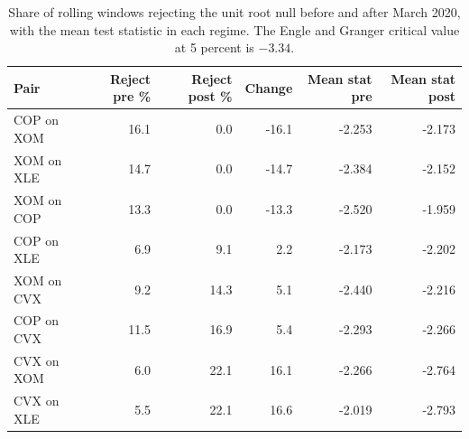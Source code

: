\begin{table}[H]
\centering
\caption{Share of rolling windows rejecting the unit root null before and after March 2020, with the mean test statistic in each regime. The Engle and Granger critical value at 5 percent is $-3.34$.} 
\label{tab:rolling_regime}
\begin{tabular}{lrrrrr}
  \toprule
Pair & Reject pre \% & Reject post \% & Change & Mean stat pre & Mean stat post \\ 
  \midrule
COP on XOM & 16.1 & 0.0 & -16.1 & -2.253 & -2.173 \\ 
  XOM on XLE & 14.7 & 0.0 & -14.7 & -2.384 & -2.152 \\ 
  XOM on COP & 13.3 & 0.0 & -13.3 & -2.520 & -1.959 \\ 
  COP on XLE & 6.9 & 9.1 & 2.2 & -2.173 & -2.202 \\ 
  XOM on CVX & 9.2 & 14.3 & 5.1 & -2.440 & -2.216 \\ 
  COP on CVX & 11.5 & 16.9 & 5.4 & -2.293 & -2.266 \\ 
  CVX on XOM & 6.0 & 22.1 & 16.1 & -2.266 & -2.764 \\ 
  CVX on XLE & 5.5 & 22.1 & 16.6 & -2.019 & -2.793 \\ 
   \bottomrule
\end{tabular}
\end{table}
